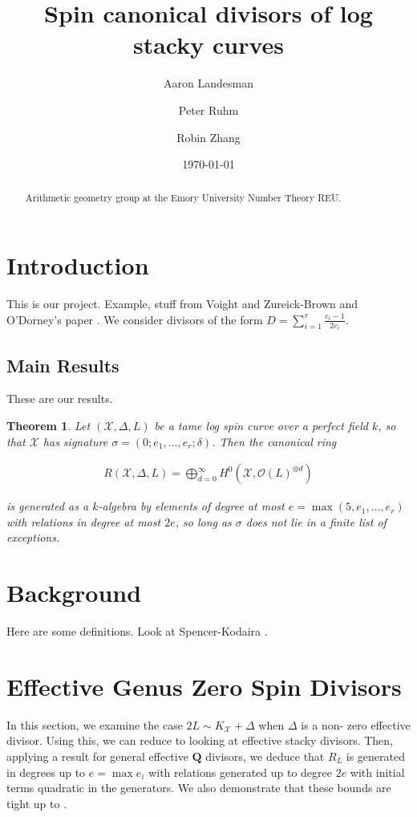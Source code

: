 \documentclass{amsart}
\title{Spin canonical divisors of log stacky curves}
\author{Aaron Landesman}
\author{Peter Ruhm}
\author{Robin Zhang}
\date{\today}
\theoremstyle{plain}
\newtheorem{thm}{Theorem}[section]
\theoremstyle{definition}
\theoremstyle{remark}
\numberwithin{equation}{section}
\newcommand \sx{\mathscr X}
\newcommand\sco{{\mathscr O}}
\newcommand \subhalf[1]{\frac{{#1} - 1}{2{#1}}}
\newcommand \halfcan{L}
\begin{document}
\begin{abstract}
  Arithmetic geometry group at the Emory University Number Theory
	REU.
\end{abstract}

\maketitle

\tableofcontents

\section{Introduction}
This is our project.
Example, stuff from Voight and Zureick-Brown \cite{vzb:stacky}
and O'Dorney's paper \cite{dorney:canonical}.
We consider divisors of the form $D = \sum_{i = 1}^{r} \subhalf{e_i}$.

\subsection{Main Results}
These are our results.
\begin{thm}
\label{thm:g_0_generators_relations}
Let $(\sx, \Delta, L)$ be a tame log spin curve over a perfect field $k$, so
that $\sx$ has signature $\sigma = (0; e_1, \ldots, e_r; \delta)$. Then the
canonical ring

\begin{align*}
	R(\sx, \Delta, L) = \bigoplus_{d = 0}^\infty H^0(\sx, \sco(L)^{\otimes d})
\end{align*}

\noindent
is generated as a $k$-algebra by elements of degree at most $e = 
\max(5,e_1,\ldots, e_r)$ with relations in degree at most $2e$, so 
long as $\sigma$ does not lie in a finite list of exceptions. 
\end{thm}


\section{Background}
Here are some definitions.
Look at Spencer-Kodaira \cite{kodaira:complex-manifolds}.

\section{Effective Genus Zero Spin Divisors}
\label{sec:g_0_effective}
In this section, we examine the case $2\halfcan\sim K_\sx+\Delta$ 
when $\Delta$ is a non- zero effective divisor.  Using this, we can 
reduce to looking at effective stacky divisors.  Then, applying a 
result for general effective $\mathbf{Q}$ divisors, we deduce that $
R_{\halfcan}$ is generated in degrees up to $e=\max{e_i}$ with 
relations generated up to degree $2e$ with initial terms quadratic 
in the generators.  We also demonstrate that these bounds are tight 
up to .
\end{document}
